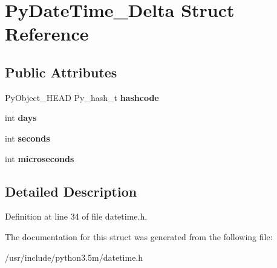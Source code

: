 \hypertarget{structPyDateTime__Delta}{}\section{Py\+Date\+Time\+\_\+\+Delta Struct Reference}
\label{structPyDateTime__Delta}
\subsection*{Public Attributes}
\begin{DoxyCompactItemize}
\item 
Py\+Object\+\_\+\+H\+E\+AD Py\+\_\+hash\+\_\+t {\bfseries hashcode}\hypertarget{structPyDateTime__Delta_a211c38f19756ed9c645fb8dc692396cb}{}\label{structPyDateTime__Delta_a211c38f19756ed9c645fb8dc692396cb}

\item 
int {\bfseries days}\hypertarget{structPyDateTime__Delta_a41436e9bfcd0b005c33f0d57bb4ab3a0}{}\label{structPyDateTime__Delta_a41436e9bfcd0b005c33f0d57bb4ab3a0}

\item 
int {\bfseries seconds}\hypertarget{structPyDateTime__Delta_a31d1e1c9eeccdb867ec43536a4b6c721}{}\label{structPyDateTime__Delta_a31d1e1c9eeccdb867ec43536a4b6c721}

\item 
int {\bfseries microseconds}\hypertarget{structPyDateTime__Delta_a0c712ea03616f403e388033d768ebcab}{}\label{structPyDateTime__Delta_a0c712ea03616f403e388033d768ebcab}

\end{DoxyCompactItemize}


\subsection{Detailed Description}


Definition at line 34 of file datetime.\+h.



The documentation for this struct was generated from the following file\+:\begin{DoxyCompactItemize}
\item 
/usr/include/python3.\+5m/datetime.\+h\end{DoxyCompactItemize}
